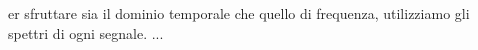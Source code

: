 er sfruttare sia il dominio temporale che quello di frequenza, utilizziamo gli spettri di ogni segnale. ...